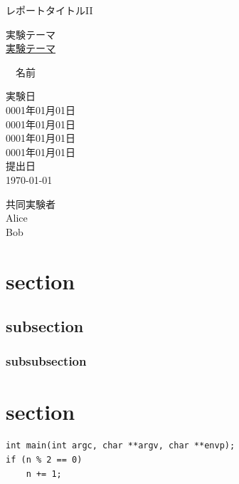 \documentclass{jsarticle}
\begin{document}
\begin{center}
  \Huge レポートタイトルI\hspace{-3pt}I \par
  \vspace{15mm}
  \LARGE 実験テーマ \\ \underline{実験テーマ} \par
  \vspace{10mm}　名前\\ \par
  \vspace{40mm}
  \Large 実験日\\0001年01月01日\\
                 0001年01月01日\\
				 0001年01月01日\\
				 0001年01月01日\\
  \vspace{5mm}
         提出日\\ \today \par



  \vspace{15mm}
  \Large 共同実験者\\Alice \\
                     Bob   \\

\end{center}

\thispagestyle{empty}
\clearpage
\addtocounter{page}{-1}

\newpage

\section{section}
\subsection{subsection}
\subsubsection{subsubsection}

\section{section}

\begin{lstlisting}[caption=プログラム, label=prog:prog]
int main(int argc, char **argv, char **envp);
if (n % 2 == 0)
	n += 1;
\end{lstlisting}
\end{document}
